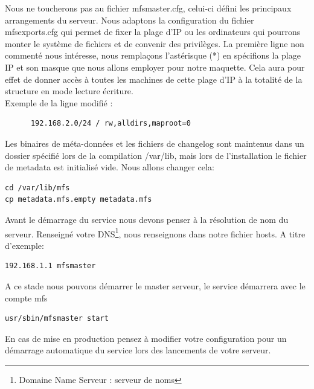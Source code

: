 \documentclass[12pt]{report}
\begin{document}
Nous ne toucherons pas au fichier mfsmaster.cfg, celui-ci défini les principaux arrangements du serveur.
Nous adaptons la configuration du fichier mfsexports.cfg qui permet de fixer la plage d'IP ou les ordinateurs qui pourrons monter le système de fichiers et de convenir des privilèges.
La première ligne non commenté nous intéresse, nous remplaçons l'astérisque (*) en spécifions la plage IP et son masque que nous allons employer pour notre maquette.
Cela aura pour effet de donner accès à toutes les machines de cette plage d'IP à la totalité de la structure en mode lecture écriture.\\
Exemple de la ligne modifié :
\begin{lstlisting}
	  192.168.2.0/24 / rw,alldirs,maproot=0
	  \end{lstlisting}
Les binaires de méta-données et les fichiers de changelog sont maintenus dans un dossier spécifié lors de la compilation /var/lib, mais lors de l'installation le fichier de metadata est initialisé vide.
Nous allons changer cela: 
\begin{lstlisting}
cd /var/lib/mfs
cp metadata.mfs.empty metadata.mfs
	  \end{lstlisting}
Avant le démarrage du service nous devons penser à la résolution de nom du serveur. Renseigné votre DNS\footnote{Domaine Name Serveur : serveur de noms}, nous renseignons dans notre fichier hosts.
A titre d'exemple:
  \begin{lstlisting}
192.168.1.1 mfsmaster
	  \end{lstlisting}
A ce stade nous pouvons démarrer le master serveur, le service démarrera avec le compte mfs
  \begin{lstlisting}
usr/sbin/mfsmaster start
	  \end{lstlisting}
En cas de mise en production pensez à modifier votre configuration pour un démarrage automatique du service lors des lancements de votre serveur.
\end{document}
